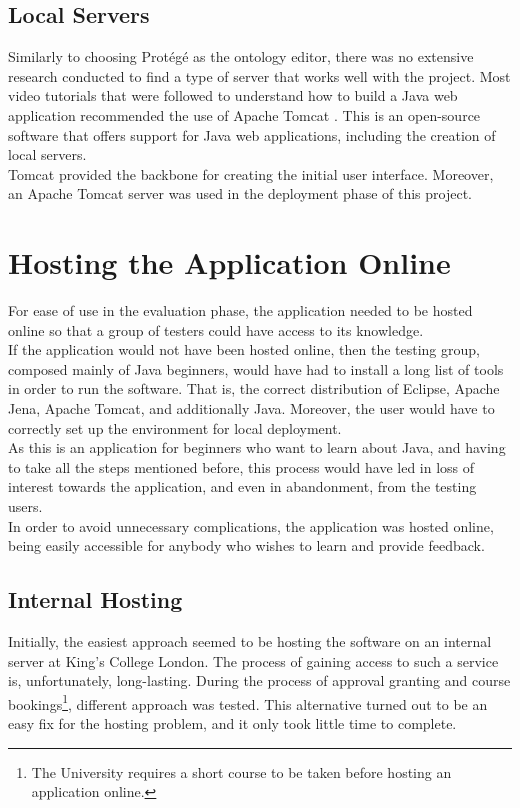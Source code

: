 \documentclass[12pt]{report}
\begin{document}
	\subsection{Local Servers}
	Similarly to choosing Protégé as the ontology editor, there was no extensive research conducted to find a type of server that works well with the project. Most video tutorials that were followed to understand how to build a Java web application recommended the use of Apache Tomcat \cite{tomcat}. This is an open-source software that offers support for Java web applications, including the creation of local servers.\\
	Tomcat provided the backbone for creating the initial user interface. Moreover, an Apache Tomcat server was used in the deployment phase of this project.
	
	\section{Hosting the Application Online}
	For ease of use in the evaluation phase, the application needed to be hosted online so that a group of testers could have access to its knowledge.\\
	If the application would not have been hosted online, then the testing group, composed mainly of Java beginners, would have had to install a long list of tools in order to run the software. That is, the correct distribution of Eclipse, Apache Jena, Apache Tomcat, and additionally Java. Moreover, the user would have to correctly set up the environment for local deployment.\\
	As this is an application for beginners who want to learn about Java, and having to take all the steps mentioned before, this process would have led in loss of interest towards the application, and even in abandonment, from the testing users.\\
	In order to avoid unnecessary complications, the application was hosted online, being easily accessible for anybody who wishes to learn and provide feedback.
	\subsection{Internal Hosting}
	Initially, the easiest approach seemed to be hosting the software on an internal server at King's College London. The process of gaining access to such a service is, unfortunately, long-lasting. During the process of approval granting and course bookings\footnote{The University requires a short course to be taken before hosting an application online.}, different approach was tested. This alternative turned out to be an easy fix for the hosting problem, and it only took little time to complete.
\end{document}
